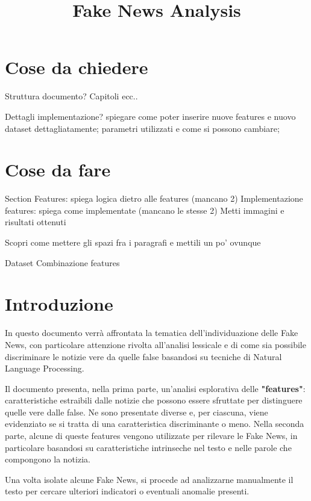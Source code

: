 \documentclass{article}
\title{Fake News Analysis}
\begin{document}
	\maketitle   
	
	\section{Cose da chiedere}
		Struttura documento? Capitoli ecc..
		
		Dettagli implementazione? spiegare come poter inserire nuove features e nuovo dataset dettagliatamente; parametri utilizzati e come si possono cambiare; 
		
	\section{Cose da fare}
	Section Features: spiega logica dietro alle features (mancano 2)
	Implementazione features: spiega come implementate (mancano le stesse 2)
		Metti immagini e risultati ottenuti
		
	Scopri come mettere gli spazi fra i paragrafi e mettili un po' ovunque
	
	Dataset
	Combinazione features
	
	 
    \newpage
    	
   	\section{Introduzione}
    	In questo documento verrà affrontata la tematica dell'individuazione delle Fake News, con particolare attenzione rivolta all'analisi lessicale e di come sia possibile discriminare le notizie vere da quelle false basandosi su tecniche di Natural Language Processing.
	    	
	    Il documento presenta, nella prima parte, un'analisi esplorativa delle \textbf{"features"}: caratteristiche estraibili dalle notizie che possono essere sfruttate per distinguere quelle vere dalle false. Ne sono presentate diverse e, per ciascuna, viene evidenziato se si tratta di una caratteristica discriminante o meno.
	    Nella seconda parte, alcune di queste features vengono utilizzate per rilevare le Fake News, in particolare basandosi su caratteristiche intrinseche nel testo e nelle parole che compongono la notizia.
	    	
	    Una volta isolate alcune Fake News, si procede ad analizzarne manualmente il testo per cercare ulteriori indicatori o eventuali anomalie presenti.
	    
\end{document}
